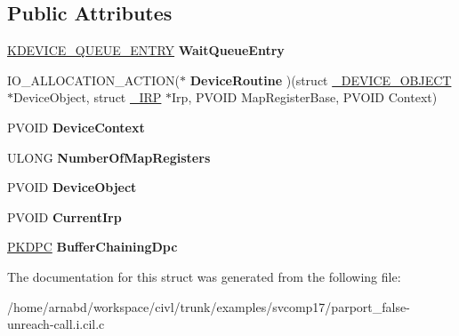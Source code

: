 \subsection*{Public Attributes}
\begin{DoxyCompactItemize}
\item 
\hypertarget{struct__WAIT__CONTEXT__BLOCK_a9d1d806f4ea0ca28fbed8b29b6a827b7}{}\hyperlink{struct__KDEVICE__QUEUE__ENTRY}{K\+D\+E\+V\+I\+C\+E\+\_\+\+Q\+U\+E\+U\+E\+\_\+\+E\+N\+T\+R\+Y} {\bfseries Wait\+Queue\+Entry}\label{struct__WAIT__CONTEXT__BLOCK_a9d1d806f4ea0ca28fbed8b29b6a827b7}

\item 
\hypertarget{struct__WAIT__CONTEXT__BLOCK_a82c1b22f412d44a47affbd4c4842c286}{}I\+O\+\_\+\+A\+L\+L\+O\+C\+A\+T\+I\+O\+N\+\_\+\+A\+C\+T\+I\+O\+N($\ast$ {\bfseries Device\+Routine} )(struct \hyperlink{struct__DEVICE__OBJECT}{\+\_\+\+D\+E\+V\+I\+C\+E\+\_\+\+O\+B\+J\+E\+C\+T} $\ast$Device\+Object, struct \hyperlink{struct__IRP}{\+\_\+\+I\+R\+P} $\ast$Irp, P\+V\+O\+I\+D Map\+Register\+Base, P\+V\+O\+I\+D Context)\label{struct__WAIT__CONTEXT__BLOCK_a82c1b22f412d44a47affbd4c4842c286}

\item 
\hypertarget{struct__WAIT__CONTEXT__BLOCK_aba14034795960c9dbdcb89567e33f700}{}P\+V\+O\+I\+D {\bfseries Device\+Context}\label{struct__WAIT__CONTEXT__BLOCK_aba14034795960c9dbdcb89567e33f700}

\item 
\hypertarget{struct__WAIT__CONTEXT__BLOCK_a68191c6c8a1802458b18113fcbe96ae6}{}U\+L\+O\+N\+G {\bfseries Number\+Of\+Map\+Registers}\label{struct__WAIT__CONTEXT__BLOCK_a68191c6c8a1802458b18113fcbe96ae6}

\item 
\hypertarget{struct__WAIT__CONTEXT__BLOCK_af917466c65120856277a46ed2103a1c3}{}P\+V\+O\+I\+D {\bfseries Device\+Object}\label{struct__WAIT__CONTEXT__BLOCK_af917466c65120856277a46ed2103a1c3}

\item 
\hypertarget{struct__WAIT__CONTEXT__BLOCK_aacfbabdd1042981d982b1d73c02322fa}{}P\+V\+O\+I\+D {\bfseries Current\+Irp}\label{struct__WAIT__CONTEXT__BLOCK_aacfbabdd1042981d982b1d73c02322fa}

\item 
\hypertarget{struct__WAIT__CONTEXT__BLOCK_a462257c360c881c0949b2233fb27eac3}{}\hyperlink{struct__KDPC}{P\+K\+D\+P\+C} {\bfseries Buffer\+Chaining\+Dpc}\label{struct__WAIT__CONTEXT__BLOCK_a462257c360c881c0949b2233fb27eac3}

\end{DoxyCompactItemize}


The documentation for this struct was generated from the following file\+:\begin{DoxyCompactItemize}
\item 
/home/arnabd/workspace/civl/trunk/examples/svcomp17/parport\+\_\+false-\/unreach-\/call.\+i.\+cil.\+c\end{DoxyCompactItemize}
